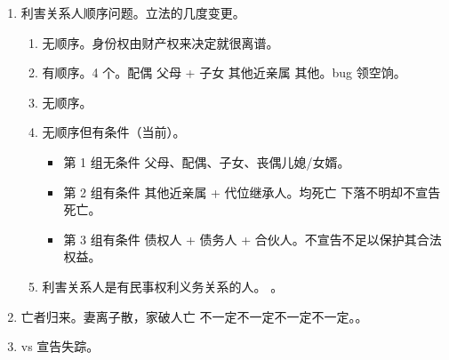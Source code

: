 \begin{enumerate}
\begin{enumerate}
\begin{enumerate}
                        \begin{enumerate}
                          \item 妻离。婚姻关系自动解除。
                          \item 子散。一方死亡，另一方送养未成年子女的，死亡一方的父母有优先抚养权。
                          \item 家破。分遗产。
                          \item 人亡。视为自然死亡，丧失民事主体资格。
                          \item 当事人不能基于宣告死亡而行使债权请求权。。
                        \end{enumerate}
                  \item 利害关系人顺序问题。立法的几度变更。
                        \begin{enumerate}
                          \item 无顺序。身份权由财产权来决定就很离谱。
                          \item 有顺序。4 个。配偶 \dy 父母 + 子女 \dy 其他近亲属 \dy 其他。bug \yjt 领空饷。
                          \item 无顺序。
                          \item 无顺序但有条件（当前）。
                                \begin{itemize}
                                  \item 第 1 组无条件 \yjt 父母、配偶、子女、丧偶儿媳/女婿。
                                  \item 第 2 组有条件 \yjt 其他近亲属 + 代位继承人。\sjt 均死亡 \hz 下落不明却不宣告死亡。
                                  \item 第 3 组有条件 \yjt 债权人 + 债务人 + 合伙人。不宣告不足以保护其合法权益。
                                \end{itemize}
                          \item 利害关系人是有民事权利义务关系的人。
                                。
                        \end{enumerate}
                        
                  \item 亡者归来。妻离子散，家破人亡 \yjt 不一定不一定不一定不一定。。
                  \item vs 宣告失踪。

\end{enumerate}
\end{enumerate}
\end{enumerate}
